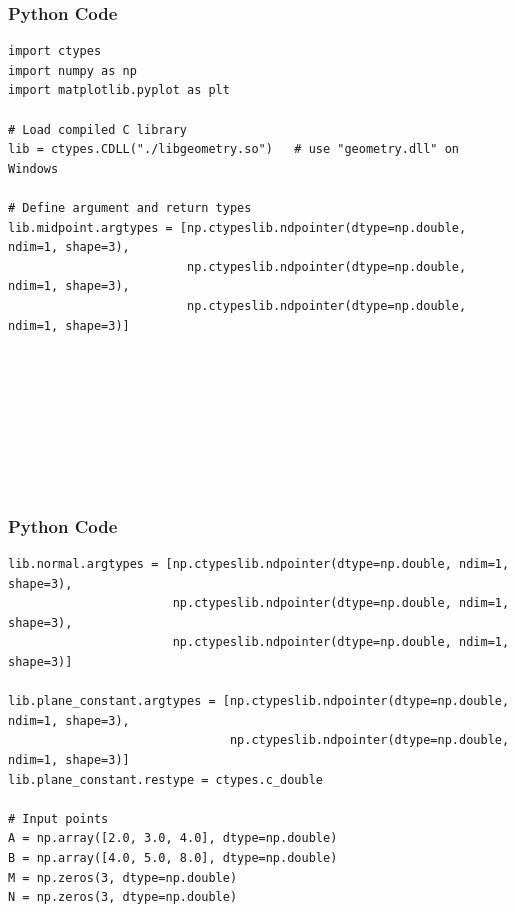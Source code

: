 \documentclass{beamer}
\begin{document}
\begin{frame}[fragile]
    \frametitle{Python Code}
    \begin{lstlisting}
import ctypes
import numpy as np
import matplotlib.pyplot as plt

# Load compiled C library
lib = ctypes.CDLL("./libgeometry.so")   # use "geometry.dll" on Windows

# Define argument and return types
lib.midpoint.argtypes = [np.ctypeslib.ndpointer(dtype=np.double, ndim=1, shape=3),
                         np.ctypeslib.ndpointer(dtype=np.double, ndim=1, shape=3),
                         np.ctypeslib.ndpointer(dtype=np.double, ndim=1, shape=3)]









    \end{lstlisting}
\end{frame}

\begin{frame}[fragile]
    \frametitle{Python Code}
    \begin{lstlisting}
lib.normal.argtypes = [np.ctypeslib.ndpointer(dtype=np.double, ndim=1, shape=3),
                       np.ctypeslib.ndpointer(dtype=np.double, ndim=1, shape=3),
                       np.ctypeslib.ndpointer(dtype=np.double, ndim=1, shape=3)]

lib.plane_constant.argtypes = [np.ctypeslib.ndpointer(dtype=np.double, ndim=1, shape=3),
                               np.ctypeslib.ndpointer(dtype=np.double, ndim=1, shape=3)]
lib.plane_constant.restype = ctypes.c_double

# Input points
A = np.array([2.0, 3.0, 4.0], dtype=np.double)
B = np.array([4.0, 5.0, 8.0], dtype=np.double)
M = np.zeros(3, dtype=np.double)
N = np.zeros(3, dtype=np.double)


    \end{lstlisting}
\end{frame}
\end{document}

